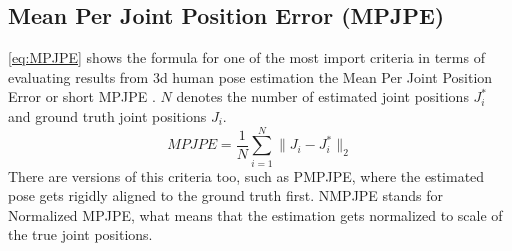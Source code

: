 \subsection{Mean Per Joint Position Error (MPJPE)}
\label{criteria:mpjpe}
\autoref{eq:MPJPE} shows the formula for one of the most import criteria in terms of evaluating results from 3d human pose estimation the Mean Per Joint Position Error or short MPJPE \cite{Zheng2020}. $N$ denotes the number of estimated joint positions $J_{i}^*$ and ground truth joint positions $J_{i}$. 
\begin{equation}
\label{eq:MPJPE}
MPJPE = \frac{1}{N} \sum_{i=1}^{N} \lVert J_{i} - J_{i}^*\rVert_{2}
\end{equation}
There are versions of this criteria too, such as PMPJPE, where the estimated pose gets rigidly aligned to the ground truth first. NMPJPE stands for Normalized MPJPE, what means that the estimation gets normalized to scale of the true joint positions. 
